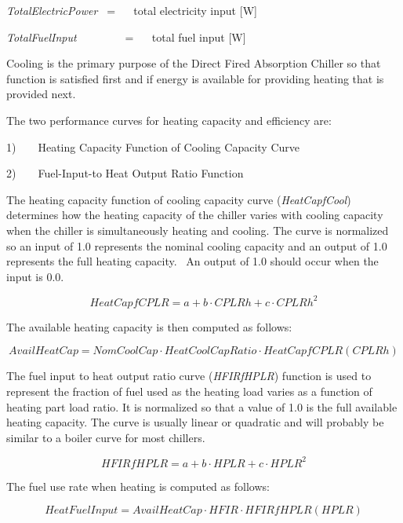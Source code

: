 \emph{TotalElectricPower~} = ~~ total electricity input {[}W{]}

\emph{TotalFuelInput~~~~~~~~} = ~~ total fuel input {[}W{]}

Cooling is the primary purpose of the Direct Fired Absorption Chiller so that function is satisfied first and if energy is available for providing heating that is provided next.

The two performance curves for heating capacity and efficiency are:

1)~~~~Heating Capacity Function of Cooling Capacity Curve

2)~~~~Fuel-Input-to Heat Output Ratio Function

The heating capacity function of cooling capacity curve (\emph{HeatCapfCool}) determines how the heating capacity of the chiller varies with cooling capacity when the chiller is simultaneously heating and cooling. The curve is normalized so an input of 1.0 represents the nominal cooling capacity and an output of 1.0 represents the full heating capacity.~ An output of 1.0 should occur when the input is 0.0.

\begin{equation}
HeatCapfCPLR = a + b \cdot CPLRh + c \cdot CPLR{h^2}
\end{equation}

The available heating capacity is then computed as follows:

\begin{equation}
AvailHeatCap = NomCoolCap \cdot HeatCoolCapRatio \cdot HeatCapfCPLR(CPLRh)
\end{equation}

The fuel input to heat output ratio curve (\emph{HFIRfHPLR}) function is used to represent the fraction of fuel used as the heating load varies as a function of heating part load ratio. It is normalized so that a value of 1.0 is the full available heating capacity. The curve is usually linear or quadratic and will probably be similar to a boiler curve for most chillers.

\begin{equation}
HFIRfHPLR = a + b \cdot HPLR + c \cdot HPL{R^2}
\end{equation}

The fuel use rate when heating is computed as follows:

\begin{equation}
HeatFuelInput = AvailHeatCap \cdot HFIR \cdot HFIRfHPLR(HPLR)
\end{equation}

